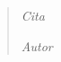 \thispagestyle{empty}
\vspace*{\fill}
\begin{quote}
	\raggedleft
	\emph{Cita}
	
	\bigskip
	\emph{Autor}
\end{quote}
\vspace*{\fill}


